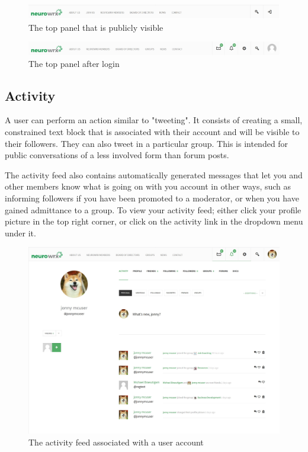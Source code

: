 \documentclass[10pt]{article}
\begin{document}
\begin{figure}[h]
    \centering
    \includegraphics[scale=0.3]{images/topbar.jpg}
    \caption{The top panel that is publicly visible}
    \label{topbar}
\end{figure}

\begin{figure}[h]
    \centering
    \includegraphics[scale=0.3]{images/topbarlogged.jpg}
    \caption{The top panel after login}
    \label{topbarlogged}
\end{figure}

\subsection{Activity} \label{Activity}

\begin{flushleft}
A user can perform an action similar to "tweeting".  It consists of creating a small, constrained text block that is associated with their account and will be visible to their followers.  They can also tweet in a particular group.  This is intended for public conversations of a less involved form than forum posts.  
\end{flushleft}

\begin{flushleft}
The activity feed also contains automatically generated messages that let you and other members know what is going on with you account in other ways, such as informing followers if you have been promoted to a moderator, or when you have gained admittance to a group.  To view your activity feed; either click your profile picture in the top right corner, or click on the activity link in the dropdown menu under it. 
\end{flushleft}

\begin{figure}[H]
    \centering
    \includegraphics[scale=0.3]{images/whatsnew.jpg}
    \caption{The activity feed associated with a user account}
    \label{whatsnew}
\end{figure}
\end{document}
